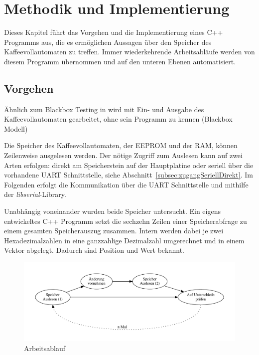 \chapter{Methodik und Implementierung}
Dieses Kapitel führt das Vorgehen und die Implementierung eines C++ Programms aus, die es ermöglichen Aussagen über den Speicher des Kaffeevollautomaten zu treffen.
Immer wiederkehrende Arbeitsabläufe werden von diesem Programm übernommen und auf den unteren Ebenen automatisiert.

\section{Vorgehen}
\todo Ähnlich zum Blackbox Testing in \cite{Solr-599853700} wird mit Ein- und Ausgabe des Kaffeevollautomaten gearbeitet, ohne sein Programm zu kennen (Blackbox Modell)\todo

Die Speicher des Kaffeevollautomaten, der \ac{EEPROM} und der \ac{RAM}, können Zeilenweise ausgelesen werden.
Der nötige Zugriff zum Auslesen kann auf zwei Arten erfolgen: direkt am Speicherstein auf der Hauptplatine oder seriell über die vorhandene \ac{UART} Schnittstelle, siehe Abschnitt~\ref{subsec:zugangSeriellDirekt}.
Im Folgenden erfolgt die Kommunikation über die \ac{UART} Schnittstelle und mithilfe der \textit{libserial}-Library.

Unabhängig voneinander wurden beide Speicher untersucht.
Ein eigens entwickeltes C++ Programm setzt die sechzehn Zeilen einer Speicherabfrage zu einem gesamten Speicherauszug zusammen.
Intern werden dabei je zwei Hexadezimalzahlen in eine ganzzahlige Dezimalzahl umgerechnet und in einem Vektor abgelegt.
Dadurch sind Position und Wert bekannt.

\begin{figure}
  \begin{center}
    \includegraphics[scale=0.54]{images/chapter_4/workflow}
    \caption{Arbeitsablauf}
    \label{fig:workflow}
  \end{center}
\end{figure}

